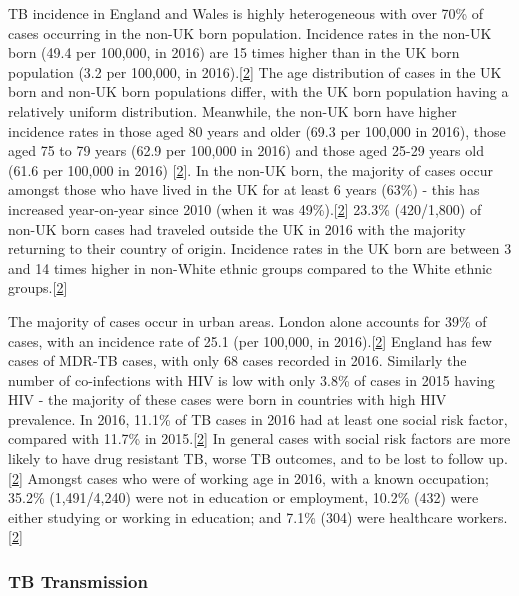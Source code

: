 \documentclass[11pt,twoside]{bristolthesis}
\begin{document}
  TB incidence in England and Wales is highly heterogeneous with over 70\% of cases occurring in the non-UK born population. Incidence rates in the non-UK born (49.4 per 100,000, in 2016) are 15 times higher than in the UK born population (3.2 per
  100,000, in 2016).{[}\protect\hyperlink{ref-PHE2017}{2}{]} The age distribution of cases in the UK born and non-UK born populations differ, with the UK born population having a relatively uniform distribution. Meanwhile, the non-UK born have higher incidence rates in those aged 80 years and older (69.3 per 100,000 in 2016), those aged 75 to 79 years (62.9 per 100,000 in 2016) and those aged 25-29 years old (61.6 per 100,000 in 2016) {[}\protect\hyperlink{ref-PHE2017}{2}{]}. In the non-UK born, the majority of cases occur amongst those who have lived in the UK for at least 6 years (63\%) - this has increased year-on-year since 2010 (when it was 49\%).{[}\protect\hyperlink{ref-PHE2017}{2}{]} 23.3\% (420/1,800) of non-UK born cases had traveled outside the UK in 2016 with the majority returning to their country of origin. Incidence rates in the UK born are between 3 and 14 times higher in non-White ethnic groups compared to the White ethnic groups.{[}\protect\hyperlink{ref-PHE2017}{2}{]}
  
  The majority of cases occur in urban areas. London alone accounts for 39\% of cases, with an incidence rate of 25.1 (per 100,000, in 2016).{[}\protect\hyperlink{ref-PHE2017}{2}{]} England has few cases of MDR-TB cases, with only 68 cases recorded in 2016. Similarly the number of co-infections with HIV is low with only 3.8\% of cases in 2015 having HIV - the majority of these cases were born in countries with high HIV prevalence. In 2016, 11.1\% of TB cases in 2016 had at least one social risk factor, compared with 11.7\% in 2015.{[}\protect\hyperlink{ref-PHE2017}{2}{]} In general cases with social risk factors are more likely to have drug resistant TB, worse TB outcomes, and to be lost to follow up.{[}\protect\hyperlink{ref-PHE2017}{2}{]} Amongst cases who were of working age in 2016, with a known occupation; 35.2\% (1,491/4,240) were not in education or employment, 10.2\% (432) were either studying or working in education; and 7.1\% (304) were healthcare workers.{[}\protect\hyperlink{ref-PHE2017}{2}{]}
  
  \hypertarget{tb-transmission}{%
  \subsubsection{TB Transmission}\label{tb-transmission}}
  
\end{document}
